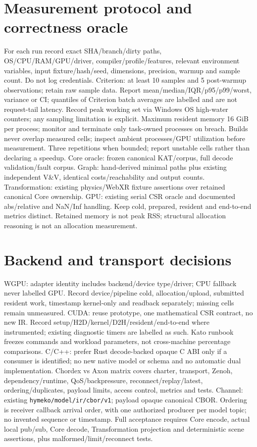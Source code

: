 \documentclass[10pt,a4paper]{article}
\begin{document}
\section{Measurement protocol and correctness oracle}
For each run record exact SHA/branch/dirty paths, OS/CPU/RAM/GPU/driver, compiler/profile/features, relevant environment variables, input fixture/hash/seed, dimensions, precision, warmup and sample count. Do not log credentials. Criterion: at least 10 samples and 5 post-warmup observations; retain raw sample data. Report mean/median/IQR/p95/p99/worst, variance or CI; quantiles of Criterion batch averages are labelled and are not request-tail latency.
Record peak working set via Windows OS high-water counters; any sampling limitation is explicit. Maximum resident memory 16 GiB per process; monitor and terminate only task-owned processes on breach. Builds never overlap measured cells; inspect ambient processes/GPU utilization before measurement. Three repetitions when bounded; report unstable cells rather than declaring a speedup.
Core oracle: frozen canonical KAT/corpus, full decode validation/fault corpus. Graph: hand-derived minimal paths plus existing independent V\&V, identical costs/reachability and output counts. Transformation: existing physics/WebXR fixture assertions over retained canonical Core ownership. GPU: existing serial CSR oracle and documented abs/relative and NaN/Inf handling. Keep cold, prepared, resident and end-to-end metrics distinct. Retained memory is not peak RSS; structural allocation reasoning is not an allocation measurement.
\section{Backend and transport decisions}
WGPU: adapter identity includes backend/device type/driver; CPU fallback never labelled GPU. Record device/pipeline cold, allocation/upload, submitted resident work, timestamp kernel-only and readback separately; missing cells remain unmeasured.
CUDA: reuse prototype, one mathematical CSR contract, no new IR. Record setup/H2D/kernel/D2H/resident/end-to-end where instrumented; existing diagnostic timers are labelled as such. Kato runbook freezes commands and workload parameters, not cross-machine percentage comparisons.
C/C++: prefer Rust decode-backed opaque C ABI only if a consumer is identified; no new native model or schema and no automatic dual implementation.
Chordex vs Axon matrix covers charter, transport, Zenoh, dependency/runtime, QoS/backpressure, reconnect/replay/latest, ordering/duplicates, payload limits, access control, metrics and tests. Channel: existing \texttt{hymeko/model/ir/cbor/v1}; payload opaque canonical CBOR. Ordering is receiver callback arrival order, with one authorized producer per model topic; no invented sequence or timestamp. Full acceptance requires Core encode, actual local pub/sub, Core decode, Transformation projection and deterministic scene assertions, plus malformed/limit/reconnect tests.
\end{document}
